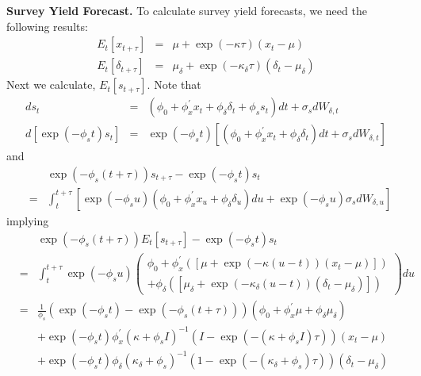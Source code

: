\documentclass{article}
\begin{document}
\textbf{Survey Yield Forecast.} To calculate survey yield forecasts, we need
the following results: 
\begin{eqnarray*}
E_{t}\left[ x_{t+\tau }\right]  &=&\mu +\exp \left( -\kappa \tau \right)
\left( x_{t}-\mu \right)  \\
E_{t}\left[ \delta _{t+\tau }\right]  &=&\mu _{\delta }+\exp \left( -\kappa
_{\delta }\tau \right) \left( \delta _{t}-\mu _{\delta }\right) 
\end{eqnarray*}%
Next we calculate, $E_{t}\left[ s_{t+\tau }\right] $. Note that 
\begin{eqnarray*}
ds_{t} &=&\left( \phi _{0}+\phi _{x}^{\prime }x_{t}+\phi _{\delta }\delta
_{t}+\phi _{s}s_{t}\right) dt+\sigma _{s}dW_{\delta ,t} \\
d\left[ \exp \left( -\phi _{s}t\right) s_{t}\right]  &=&\exp \left( -\phi
_{s}t\right) \left[ \left( \phi _{0}+\phi _{x}^{\prime }x_{t}+\phi _{\delta
}\delta _{t}\right) dt+\sigma _{s}dW_{\delta ,t}\right] 
\end{eqnarray*}%
and%
\begin{eqnarray*}
&&\exp \left( -\phi _{s}\left( t+\tau \right) \right) s_{t+\tau }-\exp
\left( -\phi _{s}t\right) s_{t} \\
&=&\int_{t}^{t+\tau }\left[ \exp \left( -\phi _{s}u\right) \left( \phi
_{0}+\phi _{x}^{\prime }x_{u}+\phi _{\delta }\delta _{u}\right) du+\exp
\left( -\phi _{s}u\right) \sigma _{s}dW_{\delta ,u}\right] 
\end{eqnarray*}%
implying%
\begin{eqnarray*}
&&\exp \left( -\phi _{s}\left( t+\tau \right) \right) E_{t}\left[ s_{t+\tau }%
\right] -\exp \left( -\phi _{s}t\right) s_{t} \\
&=&\int_{t}^{t+\tau }\exp \left( -\phi _{s}u\right) \left( 
\begin{array}{c}
\phi _{0}+\phi _{x}^{\prime }\left( \left[ \mu +\exp \left( -\kappa \left(
u-t\right) \right) \left( x_{t}-\mu \right) \right] \right)  \\ 
+\phi _{\delta }\left( \left[ \mu _{\delta }+\exp \left( -\kappa _{\delta
}\left( u-t\right) \right) \left( \delta _{t}-\mu _{\delta }\right) \right]
\right) 
\end{array}%
\right) du \\
&=&\frac{1}{\phi _{s}}\left( \exp \left( -\phi _{s}t\right) -\exp \left(
-\phi _{s}\left( t+\tau \right) \right) \right) \left( \phi _{0}+\phi
_{x}^{\prime }\mu +\phi _{\delta }\mu _{\delta }\right)  \\
&&+\exp \left( -\phi _{s}t\right) \phi _{x}^{\prime }\left( \kappa +\phi
_{s}I\right) ^{-1}\left( I-\exp \left( -\left( \kappa +\phi _{s}I\right)
\tau \right) \right) \left( x_{t}-\mu \right)  \\
&&+\exp \left( -\phi _{s}t\right) \phi _{\delta }\left( \kappa _{\delta
}+\phi _{s}\right) ^{-1}\left( 1-\exp \left( -\left( \kappa _{\delta }+\phi
_{s}\right) \tau \right) \right) \left( \delta _{t}-\mu _{\delta }\right) 
\end{eqnarray*}%
\end{document}

